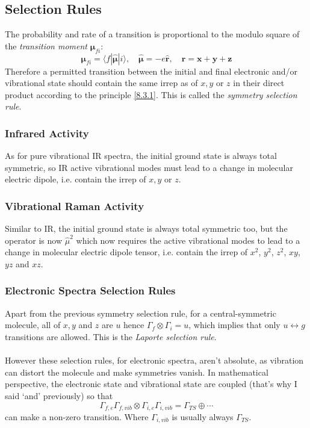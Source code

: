 	\subsection{Selection Rules}
	
		The probability and rate of a transition is proportional to the modulo square of the \emph{transition moment} $\mathbf{\mu}_{fi}$:
		\[\mathbf{\mu}_{fi} = \langle f | \mathbf{\hat{\mu}} | i \rangle, 
		\quad \mathbf{\hat{\mu}} = -e\mathbf{\hat{r}}, \quad \mathbf{r} = \mathbf{x} + \mathbf{y} + \mathbf{z}\]
		Therefore a permitted transition between the initial and final electronic and/or vibrational state 
		should contain the same irrep as of $x, y$ or $z$ in their direct product according to the principle \ref{8.3.1}. 
		This is called the \emph{symmetry selection rule}.
		
		\subsubsection{Infrared Activity}
			As for pure vibrational IR spectra, the initial ground state is always total symmetric, 
			so IR active vibrational modes must lead to a change in molecular electric dipole, i.e. contain the irrep of $x, y$ or $z$.
		
		\subsubsection{Vibrational Raman Activity}
			Similar to IR, the initial ground state is always total symmetric too, but the operator is now $\hat{\mu}^2$ 
			which now requires the active vibrational modes to lead to a change in molecular electric dipole tensor, 
			i.e. contain the irrep of $x^2$, $y^2$, $z^2$, $xy$, $yz$ and $xz$.
			
		\subsubsection{Electronic Spectra Selection Rules}\label{laporte}
			Apart from the previous symmetry selection rule, for a central-symmetric molecule, 
			all of $x, y$ and $z$ are $u$ hence $\Gamma_f \otimes \Gamma_i = u$, 
			which implies that only $u \leftrightarrow g$ transitions are allowed. This is the \emph{Laporte selection rule}.\\\ \\
			However these selection rules, for electronic spectra, aren't absolute, as vibration can distort the molecule and make symmetries vanish.
			In mathematical perspective, the electronic state and vibrational state are coupled (that's why I said `and' previously) so that
			\[\Gamma_{f,e}\Gamma_{f,vib} \otimes \Gamma_{i,e}\Gamma_{i,vib} = \Gamma_{TS} \oplus \cdots\]
			can make a non-zero transition. Where $\Gamma_{i,vib}$ is usually always $\Gamma_{TS}$.
			
